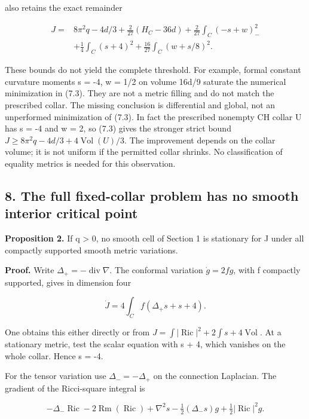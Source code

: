 \documentclass[
  10pt,
]{article}
\begin{document}
also retains the exact remainder

\[
\begin{aligned}
 J={}&8\pi^2q-4d/3+\frac2{27}(H_C-36d)
 +\frac2{27}\int_C(-s+w)_-^2\\
 &+\frac14\int_C(s+4)^2
 +\frac{16}{27}\int_C(w+s/8)^2.
\end{aligned}                                             \tag{7.3}
\]

These bounds do not yield the complete threshold. For example, formal
constant curvature moments s = -4, w = 1/2 on volume 16d/9 saturate the
numerical minimization in (7.3). They are not a metric filling and do
not match the prescribed collar. The missing conclusion is differential
and global, not an unperformed minimization of (7.3). In fact the
prescribed nonempty CH collar U has s = -4 and w = 2, so (7.3) gives the
stronger strict bound \(J\ge8\pi^2q-4d/3+4\operatorname{Vol}(U)/3\). The
improvement depends on the collar volume; it is not uniform if the
permitted collar shrinks. No classification of equality metrics is
needed for this observation.

\hypertarget{the-full-fixed-collar-problem-has-no-smooth-interior-critical-point}{%
\subsection{8. The full fixed-collar problem has no smooth interior
critical
point}\label{the-full-fixed-collar-problem-has-no-smooth-interior-critical-point}}

\textbf{Proposition 2.} If q \textgreater{} 0, no smooth cell of Section
1 is stationary for J under all compactly supported smooth metric
variations.

\textbf{Proof.} Write \(\Delta_+=-\operatorname{div}\nabla\). The
conformal variation \(\dot g=2fg\), with f compactly supported, gives in
dimension four

\[
             \dot J=4\int_C f(\Delta_+s+s+4).             \tag{8.1}
\]

One obtains this either directly or from
\(J=\int|\operatorname{Ric}|^2+2\int s+4\operatorname{Vol}\). At a
stationary metric, test the scalar equation with s + 4, which vanishes
on the whole collar. Hence s = -4.

For the tensor variation use \(\Delta_-=-\Delta_+\) on the connection
Laplacian. The gradient of the Ricci-square integral is

\[
 -\Delta_-\operatorname{Ric}-2\operatorname{Rm}(\operatorname{Ric})
 +\nabla^2s-\tfrac12(\Delta_-s)g+\tfrac12|\operatorname{Ric}|^2g.
\]
\end{document}
